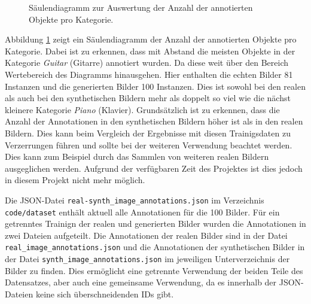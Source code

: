 \begin{figure}
{
    }
    \caption{Säulendiagramm zur Auswertung der Anzahl der annotierten Objekte pro Kategorie.}
    \label{fig:annotation_bar_chart}
\end{figure}

Abbildung \ref{fig:annotation_bar_chart} zeigt ein Säulendiagramm der Anzahl der annotierten Objekte pro Kategorie. Dabei ist zu erkennen, dass mit Abstand die meisten Objekte in der Kategorie \emph{Guitar} (Gitarre) annotiert wurden. Da diese weit über den Bereich Wertebereich des Diagramms hinausgehen. Hier enthalten die echten Bilder 81 Instanzen und die generierten Bilder 100 Instanzen. Dies ist sowohl bei den realen als auch bei den synthetischen Bildern mehr als doppelt so viel wie die nächst kleinere Kategorie \emph{Piano} (Klavier). Grundsätzlich ist zu erkennen, dass die Anzahl der Annotationen in den synthetischen Bildern höher ist als in den realen Bildern. Dies kann beim Vergleich der Ergebnisse mit diesen Trainigsdaten zu Verzerrungen führen und sollte bei der weiteren Verwendung beachtet werden. Dies kann zum Beispiel durch das Sammlen von weiteren realen Bildern ausgeglichen werden. Aufgrund der verfügbaren Zeit des Projektes ist dies jedoch in diesem Projekt nicht mehr möglich.

Die JSON-Datei \texttt{real-synth\_image\_annotations.json} im Verzeichnis \texttt{code/dataset} enthält aktuell alle Annotationen für die 100 Bilder. Für ein getrenntes Trainign der realen und generierten Bilder wurden die Annotationen in zwei Dateien aufgeteilt. Die Annotationen der realen Bilder sind in der Datei \texttt{real\_image\_annotations.json} und die Annotationen der synthetischen Bilder in der Datei \texttt{synth\_image\_annotations.json} im jeweiligen Unterverzeichnis der Bilder zu finden.
Dies ermöglicht eine getrennte Verwendung der beiden Teile des Datensatzes, aber auch eine gemeinsame Verwendung, da es innerhalb der JSON-Dateien keine sich überschneidenden IDs gibt.

